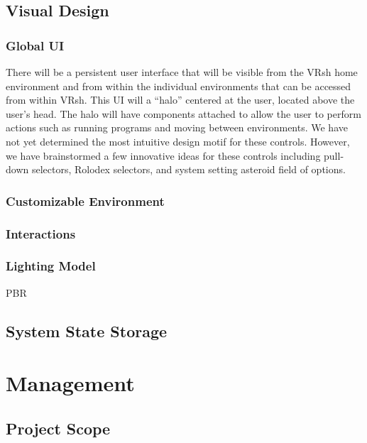 \documentclass[titlepage,12pt]{article}
\newcommand\name{VRsh\xspace}
\begin{document}
\subsection{Visual Design}

\subsubsection{Global UI}\label{sec:ui}
There will be a persistent user interface that will be visible from the \name
home environment and from within the individual environments that can be
accessed from within \name. This UI will a ``halo'' centered at the user,
located above the user's head. The halo will have components attached to allow
the user to perform actions such as running programs and moving between
environments. We have not yet determined the most intuitive design motif for
these controls. However, we have brainstormed a few innovative ideas for these
controls including pull-down selectors, Rolodex selectors, and system setting
asteroid field of options.

\subsubsection{Customizable Environment}\label{sec:env}

\subsubsection{Interactions}

\subsubsection{Lighting Model}
PBR

\subsection{System State Storage}\label{sec:state}

\section{Management}

\subsection{Project Scope}
\end{document}
